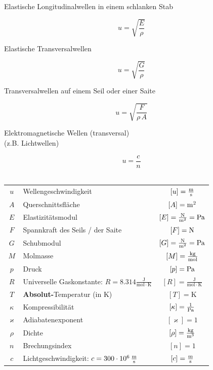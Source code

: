 \begin{minipage}{0.45\linewidth}
Elastische Longitudinalwellen in einem schlanken Stab
\end{minipage}
\hfill
\begin{minipage}{0.48\linewidth}
$$\boxed{ u = \sqrt{\frac{E}{\rho}} }$$
\end{minipage}

\begin{minipage}{0.45\linewidth}
Elastische Transversalwellen
\end{minipage}
\hfill
\begin{minipage}{0.48\linewidth}
$$\boxed{ u = \sqrt{\frac{G}{\rho}} }$$
\end{minipage}

\begin{minipage}{0.45\linewidth}
Transversalwellen auf einem Seil oder einer Saite
\end{minipage}
\hfill
\begin{minipage}{0.48\linewidth}
$$\boxed{ u = \sqrt{\frac{F}{\rho \, A}} }$$ 
\end{minipage}

\begin{minipage}{0.45\linewidth}
Elektromagnetische Wellen (transversal) \\
(z.B. Lichtwellen)
\end{minipage}
\hfill
\begin{minipage}{0.48\linewidth}
$$\boxed{ u = \frac{c}{n} }$$ \\
\end{minipage}


\renewcommand{\arraystretch}{1.1}
\begin{tabular}{c l c}
$u$ & Wellengeschwindigkeit & $[u] = \frac{\mathrm{m}}{\mathrm{s}}$ \\
$A$ & Querschnittsfläche & $[A] = \mathrm{m}^2$ \\
$E$ & Elastizitätsmodul & $[E] = \frac{\mathrm{N}}{\mathrm{m}^2} = \mathrm{Pa}$\\
$F$ & Spannkraft des Seils / der Saite & $[F] = \mathrm{N}$ \\
$G$ & Schubmodul & $[G] = \frac{\mathrm{N}}{\mathrm{m}^2} = \mathrm{Pa}$ \\
$M$ & Molmasse & $[M] = \frac{\mathrm{kg}}{\mathrm{mol}}$ \\
$p$ & Druck & $[p] = \mathrm{Pa}$ \\
$R$ & Universelle Gaskonstante: $R = 8.314 \mathrm{\frac{J}{mol \cdot K}}$ & $[R] = \mathrm{\frac{J}{mol \cdot K}} $ \\
$T$ & \textbf{Absolut-}Temperatur (in K) & $[T] = \mathrm{K}$ \\
$\kappa$ & Kompressibilität & $[\kappa] = \frac{1}{\mathrm{Pa}}$ \\
$\varkappa$ & Adiabatenexponent & $[\varkappa] = 1$ \\
$\rho$ & Dichte & $[\rho] = \frac{\mathrm{kg}}{\mathrm{m}^3}$ \\
$n$ & Brechungsindex & $[n] = 1$ \\
$c$ & Lichtgeschwindigkeit: $c = 300 \cdot 10^6 \, \frac{\mathrm{m}}{\mathrm{s}}$ & $[c] = \frac{\mathrm{m}}{\mathrm{s}}$ \\
\end{tabular}
\renewcommand{\arraystretch}{1}



